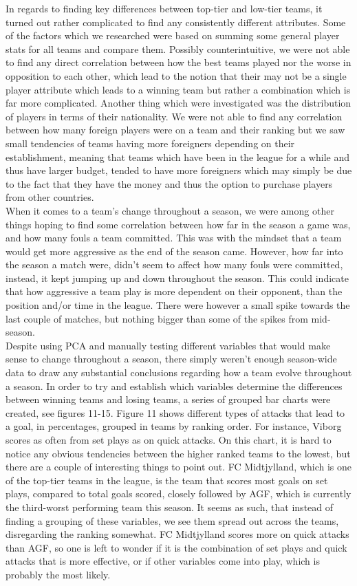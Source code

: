 \documentclass[Report.tex]{subfiles}
\begin{document}
In regards to finding key differences between top-tier and low-tier teams, it turned out rather complicated to find any consistently different attributes. Some of the factors which we researched were based on summing some general player stats for all teams and compare them. Possibly counterintuitive, we were not able to find any direct correlation between how the best teams played nor the worse in opposition to each other, which lead to the notion that their may not be a single player attribute which leads to a winning team but rather a combination which is far more complicated. Another thing which were investigated was the distribution of players in terms of their nationality. We were not able to find any correlation between how many foreign players were on a team and their ranking but we saw small tendencies of teams having more foreigners depending on their establishment, meaning that teams which have been in the league for a while and thus have larger budget, tended to have more foreigners which may simply be due to the fact that they have the money and thus the option to purchase players from other countries. \\
When it comes to a team's change throughout a season, we were among other things hoping to find some correlation between how far in the season a game was, and how many fouls a team committed. This was with the mindset that a team would get more aggressive as the end of the season came. However, how far into the season a match were, didn't seem to affect how many fouls were committed, instead, it kept jumping up and down throughout the season. This could indicate that how aggressive a team play is more dependent on their opponent, than the position and/or time in the league. There were however a small spike towards the last couple of matches, but nothing bigger than some of the spikes from mid-season.\\
Despite using PCA and manually testing different variables that would make sense to change throughout a season, there simply weren't enough season-wide data to draw any substantial conclusions regarding how a team evolve throughout a season.
In order to try and establish which variables determine the differences between
winning teams and losing teams, a series of grouped bar charts were created, see
figures 11-15. Figure 11 shows different types of attacks that lead to a goal,
in percentages, grouped in teams by ranking order. For instance, Viborg scores
as often from set plays as on quick attacks.
On this chart, it is hard to notice any obvious tendencies between the higher
ranked teams to the lowest, but there are a couple of interesting things to
point out. FC Midtjylland, which is one of the top-tier teams in the league, is
the team that scores most goals on set plays, compared to total goals scored,
closely followed by AGF, which is currently the third-worst performing team
this season. It seems as such, that instead of finding a grouping of these
variables, we see them spread out across the teams, disregarding the ranking
somewhat. FC Midtjylland scores more on quick attacks than AGF, so one is left
to wonder if it is the combination of set plays and quick attacks that is more
effective, or if other variables come into play, which is probably the most
likely. 
\end{document}
